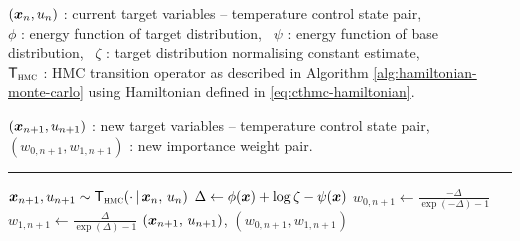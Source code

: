 \begin{algorithmic}
\small
    \Require
    $(\boldsymbol{x}_n, u_n)$ : current target variables -- temperature control state pair,\\
    $\phi$ : energy function of target distribution,~
    $\psi$ : energy function of base distribution,~
    $\zeta$  : target distribution normalising constant estimate, \\
    $\mathsf{T}_{\textsc{hmc}}$ : \ac{HMC} transition operator as described in Algorithm \ref{alg:hamiltonian-monte-carlo} using Hamiltonian defined in \eqref{eq:cthmc-hamiltonian}.
    \Ensure\raggedright
    $(\boldsymbol{x}_{n+1}, u_{n+1})$ : new target variables -- temperature control state pair, ~
    $(w_{0,n+1}, w_{1,n+1})$ : new importance weight pair.
\end{algorithmic}
\hrule
\small
\begin{algorithmic}[1]
  \State $\boldsymbol{x}_{n+1}, u_{n+1} \sim \mathsf{T}_{\textsc{hmc}}(\cdot \operatorname{|} \boldsymbol{x}_n,\,u_n)$ 
  \State $\Delta \gets \phi(\boldsymbol{x}) + \log \zeta - \psi(\boldsymbol{x})$ 
  \State $w_{0,n+1} \gets \frac{-\Delta}{\exp(-\Delta) - 1}$ 
  \State $w_{1,n+1} \gets \frac{\Delta}{\exp(\Delta) -1}$ 
  \State \Return $(\boldsymbol{x}_{n+1},\,u_{n+1})$, $(w_{0,n+1},w_{1,n+1})$
\end{algorithmic}